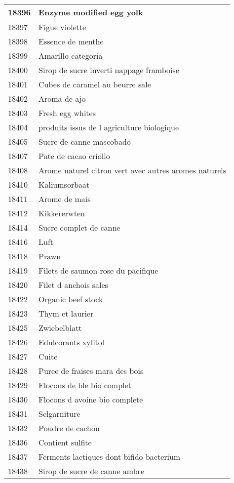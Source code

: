 \begin{longtable}{|l|l|}
18396 & Enzyme modified egg yolk \\ \hline 
18397 & Figue violette \\ \hline 
18398 & Essence de menthe \\ \hline 
18399 & Amarillo categoria \\ \hline 
18400 & Sirop de sucre inverti nappage framboise \\ \hline 
18401 & Cubes de caramel au beurre sale \\ \hline 
18402 & Aroma de ajo \\ \hline 
18403 & Fresh egg whites \\ \hline 
18404 &  produits issus de l agriculture biologique \\ \hline 
18405 & Sucre de canne mascobado \\ \hline 
18407 & Pate de cacao criollo \\ \hline 
18408 & Arome naturel citron vert avec autres aromes naturels \\ \hline 
18410 & Kaliumsorbaat \\ \hline 
18411 & Arome de mais \\ \hline 
18412 & Kikkererwten \\ \hline 
18414 & Sucre complet de canne \\ \hline 
18416 & Luft \\ \hline 
18418 & Prawn \\ \hline 
18419 & Filets de saumon rose du pacifique \\ \hline 
18420 & Filet d anchois sales \\ \hline 
18422 & Organic beef stock \\ \hline 
18423 & Thym et laurier \\ \hline 
18425 & Zwiebelblatt \\ \hline 
18426 & Edulcorants xylitol \\ \hline 
18427 & Cuite \\ \hline 
18428 & Puree de fraises mara des bois \\ \hline 
18429 & Flocons de ble bio complet \\ \hline 
18430 & Flocons d avoine bio complete \\ \hline 
18431 & Selgarniture \\ \hline 
18432 & Poudre de cachou \\ \hline 
18436 & Contient sulfite \\ \hline 
18437 & Ferments lactiques dont bifido bacterium \\ \hline 
18438 & Sirop de sucre de canne ambre \\ \hline 

\end{longtable}
